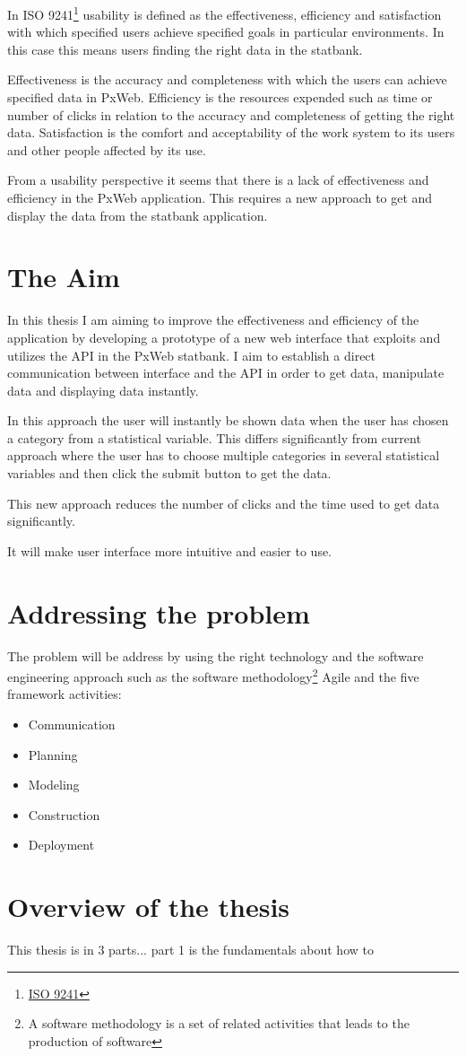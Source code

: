 In ISO 9241\footnote{\href{https://www.iso.org/search.html?q=ISO\%209241}{ISO 9241}\label{iso9241}} usability is defined as the effectiveness, efficiency and satisfaction with which specified users achieve specified goals in particular environments. In this case this means users finding the right data in the statbank.
 
Effectiveness is the accuracy and completeness with which the users can achieve specified data in PxWeb.  Efficiency is the resources expended such as time or number of clicks in relation to the accuracy and completeness of getting the right data. Satisfaction is the comfort and acceptability of the work system to its users and other people affected by its use.

From a usability perspective it seems that there is a lack of effectiveness and efficiency in the PxWeb application. This requires a new approach to get and display the data from the statbank application.

\section{The Aim}
In this thesis I am aiming to improve the effectiveness and efficiency of the application by developing a prototype of a new web interface that exploits and utilizes the API in the PxWeb statbank. I aim to establish a direct communication between interface and the API in order to get data, manipulate data and displaying data instantly.

In this approach the user will instantly be shown data when the user has chosen a category from a statistical variable. This differs significantly from current approach where the user has to choose multiple categories in several statistical variables and then click the submit button to get the data. 

This new approach reduces the number of clicks and the time used to get data significantly.

It will make user interface more intuitive and easier to use.
 
\section{Addressing the problem}
The problem will be address by using the right technology and the software engineering approach such as the software methodology\footnote{A software methodology is a set of related activities that leads to the production of software} Agile and the five framework activities:

\begin{itemize}
    \item Communication
    \item Planning
    \item Modeling
    \item Construction
    \item Deployment
\end{itemize}

\section{Overview of the thesis}

This thesis is in 3 parts... part 1 is the fundamentals about how to
